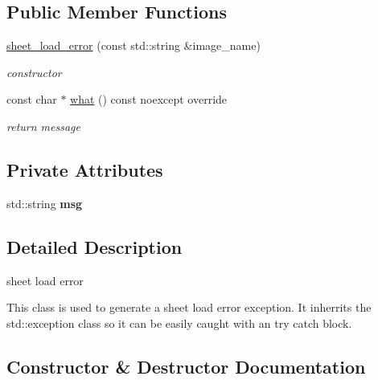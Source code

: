 \subsection*{Public Member Functions}
\begin{DoxyCompactItemize}
\item 
\hyperlink{classsheet__load__error_a80642b59420e3b58c1c5e980cf702c41}{sheet\+\_\+load\+\_\+error} (const std\+::string \&image\+\_\+name)
\begin{DoxyCompactList}\small\item\em constructor \end{DoxyCompactList}\item 
const char $\ast$ \hyperlink{classsheet__load__error_a57dd1a273a0720e58ec0eb667d0c85aa}{what} () const noexcept override
\begin{DoxyCompactList}\small\item\em return message \end{DoxyCompactList}\end{DoxyCompactItemize}
\subsection*{Private Attributes}
\begin{DoxyCompactItemize}
\item 
\mbox{\label{classsheet__load__error_ace61b8fa1d457fc96a3edd2e354f0b1a}} 
std\+::string {\bfseries msg}
\end{DoxyCompactItemize}


\subsection{Detailed Description}
sheet load error 

This class is used to generate a sheet load error exception. It inherrits the std\+::exception class so it can be easily caught with an try catch block. 

\subsection{Constructor \& Destructor Documentation}
\mbox{\label{classsheet__load__error_a80642b59420e3b58c1c5e980cf702c41}} 
